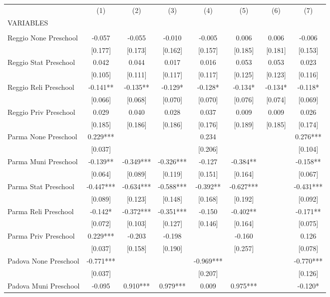 \begin{tabular}{lccccccc} \hline
 & (1) & (2) & (3) & (4) & (5) & (6) & (7) \\
VARIABLES &  &  &  &  &  &  &  \\ \hline
 &  &  &  &  &  &  &  \\
Reggio None Preschool & -0.057 & -0.055 & -0.010 & -0.005 & 0.006 & 0.006 & -0.006 \\
 & [0.177] & [0.173] & [0.162] & [0.157] & [0.185] & [0.181] & [0.153] \\
Reggio Stat Preschool & 0.042 & 0.044 & 0.017 & 0.016 & 0.053 & 0.053 & 0.023 \\
 & [0.105] & [0.111] & [0.117] & [0.117] & [0.125] & [0.123] & [0.116] \\
Reggio Reli Preschool & -0.141** & -0.135** & -0.129* & -0.128* & -0.134* & -0.134* & -0.118* \\
 & [0.066] & [0.068] & [0.070] & [0.070] & [0.076] & [0.074] & [0.069] \\
Reggio Priv Preschool & 0.029 & 0.040 & 0.028 & 0.037 & 0.009 & 0.009 & 0.026 \\
 & [0.185] & [0.186] & [0.186] & [0.176] & [0.189] & [0.185] & [0.174] \\
Parma None Preschool & 0.229*** &  &  & 0.234 &  &  & 0.276*** \\
 & [0.037] &  &  & [0.206] &  &  & [0.104] \\
Parma Muni Preschool & -0.139** & -0.349*** & -0.326*** & -0.127 & -0.384** &  & -0.158** \\
 & [0.064] & [0.089] & [0.119] & [0.151] & [0.164] &  & [0.067] \\
Parma Stat Preschool & -0.447*** & -0.634*** & -0.588*** & -0.392** & -0.627*** &  & -0.431*** \\
 & [0.089] & [0.123] & [0.148] & [0.168] & [0.192] &  & [0.092] \\
Parma Reli Preschool & -0.142* & -0.372*** & -0.351*** & -0.150 & -0.402** &  & -0.171** \\
 & [0.072] & [0.103] & [0.127] & [0.146] & [0.164] &  & [0.075] \\
Parma Priv Preschool & 0.229*** & -0.203 & -0.198 &  & -0.160 &  & 0.126 \\
 & [0.037] & [0.158] & [0.190] &  & [0.257] &  & [0.078] \\
Padova None Preschool & -0.771*** &  &  & -0.969*** &  &  & -0.770*** \\
 & [0.037] &  &  & [0.207] &  &  & [0.126] \\
Padova Muni Preschool & -0.095 & 0.910*** & 0.979*** & 0.009 & 0.975*** &  & -0.120* \\

\end{tabular}
